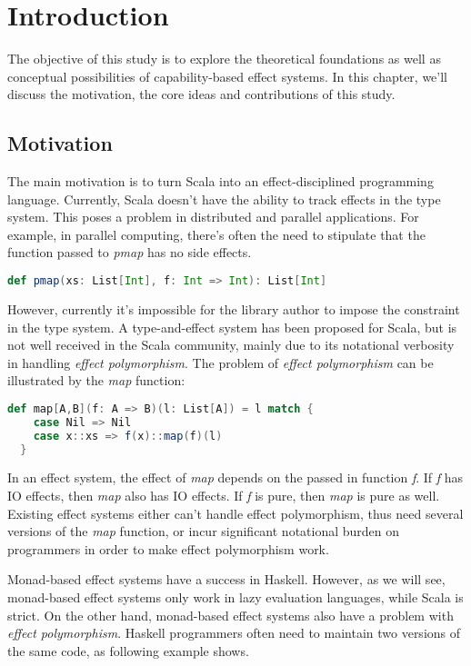 \section{Introduction}

The objective of this study is to explore the theoretical foundations
as well as conceptual possibilities of capability-based effect
systems. In this chapter, we'll discuss the motivation, the core ideas
and contributions of this study.

\subsection{Motivation}

The main motivation is to turn Scala into an effect-disciplined
programming language. Currently, Scala doesn't have the ability to
track effects in the type system. This poses a problem in distributed
and parallel applications. For example, in parallel computing, there's
often the need to stipulate that the function passed to \emph{pmap}
has no side effects.

\begin{lstlisting}[language=Scala]
def pmap(xs: List[Int], f: Int => Int): List[Int]
\end{lstlisting}

However, currently it's impossible for the library author to impose
the constraint in the type system. A type-and-effect system has been
proposed for Scala\cite{lukas2014effect}, but is not well received in
the Scala community, mainly due to its notational verbosity in
handling \emph{effect polymorphism}. The problem of \emph{effect
  polymorphism} can be illustrated by the \emph{map} function:

\begin{lstlisting}[language=Scala]
  def map[A,B](f: A => B)(l: List[A]) = l match {
    case Nil => Nil
    case x::xs => f(x)::map(f)(l)
  }
\end{lstlisting}

In an effect system, the effect of \emph{map} depends on the passed in
function \emph{f}. If \emph{f} has IO effects, then \emph{map} also
has IO effects. If \emph{f} is pure, then \emph{map} is pure as
well. Existing effect systems either can't handle effect polymorphism,
thus need several versions of the \emph{map} function, or incur
significant notational burden on programmers in order to make effect
polymorphism work.

Monad-based effect systems have a success in Haskell. However, as we
will see, monad-based effect systems only work in lazy evaluation
languages, while Scala is strict. On the other hand, monad-based
effect systems also have a problem with \emph{effect
  polymorphism}. Haskell programmers often need to maintain two
versions of the same code, as following example shows.

